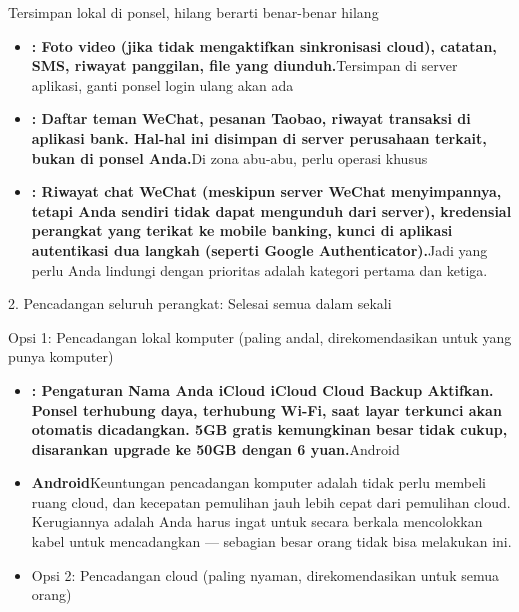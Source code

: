 


Tersimpan lokal di ponsel, hilang berarti benar-benar hilang

\begin{itemize}
  \item \textbf{: Foto video (jika tidak mengaktifkan sinkronisasi cloud), catatan, SMS, riwayat panggilan, file yang diunduh.}Tersimpan di server aplikasi, ganti ponsel login ulang akan ada
  \item \textbf{: Daftar teman WeChat, pesanan Taobao, riwayat transaksi di aplikasi bank. Hal-hal ini disimpan di server perusahaan terkait, bukan di ponsel Anda.}Di zona abu-abu, perlu operasi khusus
  \item \textbf{: Riwayat chat WeChat (meskipun server WeChat menyimpannya, tetapi Anda sendiri tidak dapat mengunduh dari server), kredensial perangkat yang terikat ke mobile banking, kunci di aplikasi autentikasi dua langkah (seperti Google Authenticator).}Jadi yang perlu Anda lindungi dengan prioritas adalah kategori pertama dan ketiga.
\end{itemize}

2. Pencadangan seluruh perangkat: Selesai semua dalam sekali


Opsi 1: Pencadangan lokal komputer (paling andal, direkomendasikan untuk yang punya komputer)


\begin{itemize}
  \item \textbf{: Pengaturan Nama Anda iCloud iCloud Cloud Backup Aktifkan. Ponsel terhubung daya, terhubung Wi-Fi, saat layar terkunci akan otomatis dicadangkan. 5GB gratis kemungkinan besar tidak cukup, disarankan upgrade ke 50GB dengan 6 yuan.}Android
  \item \textbf{Android}Keuntungan pencadangan komputer adalah tidak perlu membeli ruang cloud, dan kecepatan pemulihan jauh lebih cepat dari pemulihan cloud. Kerugiannya adalah Anda harus ingat untuk secara berkala mencolokkan kabel untuk mencadangkan — sebagian besar orang tidak bisa melakukan ini.
  \item Opsi 2: Pencadangan cloud (paling nyaman, direkomendasikan untuk semua orang)
\end{itemize}

